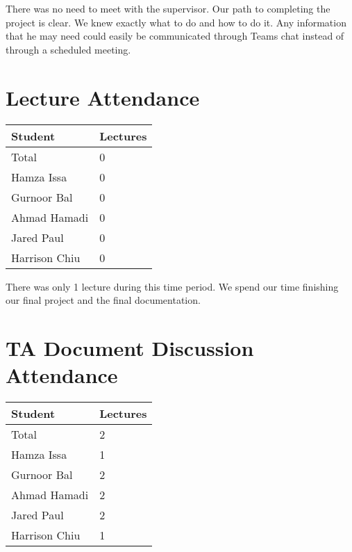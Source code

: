 \documentclass{article}
\begin{document}
There was no need to meet with the supervisor. Our path to completing the project is clear. We knew exactly what to do and how to do it. Any information that he may need could easily be communicated through Teams chat instead of through a scheduled meeting.

\section{Lecture Attendance}


\begin{table}[H]
\centering
\begin{tabular}{ll}
\toprule
\textbf{Student} & \textbf{Lectures}\\
\midrule
Total & 0\\
Hamza Issa & 0\\
Gurnoor Bal & 0\\
Ahmad Hamadi & 0\\
Jared Paul & 0\\
Harrison Chiu & 0\\
\bottomrule
\end{tabular}
\end{table}

There was only 1 lecture during this time period. We spend our time finishing our final project and the final documentation.

\section{TA Document Discussion Attendance}


\begin{table}[H]
\centering
\begin{tabular}{ll}
\toprule
\textbf{Student} & \textbf{Lectures}\\
\midrule
Total & 2\\
Hamza Issa & 1\\
Gurnoor Bal & 2\\
Ahmad Hamadi & 2\\
Jared Paul & 2\\
Harrison Chiu & 1\\
\bottomrule
\end{tabular}
\end{table}
\end{document}
